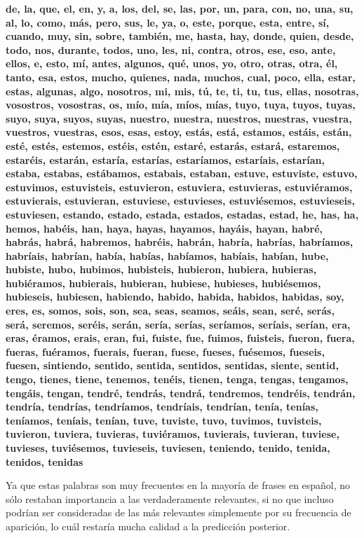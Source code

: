 \begin{displayquote}
\textbf{  de, la, que, el, en, y, a, los, del, se, las, por, un, para, con, no, una, su, al, lo, como, más, pero, sus, le, ya, o, este, porque, esta, entre, sí, cuando, muy, sin, sobre,
 también, me, hasta, hay, donde, quien, desde, todo, nos, durante, todos, uno, les, ni, contra, otros, ese, eso, ante, ellos, e, esto, mí, antes, algunos, qué, unos, yo, otro, otras, otra, él, tanto, esa, estos, mucho, quienes, nada, muchos, cual, poco, ella, estar, estas, algunas, algo, nosotros, mi, mis, tú, te, ti, tu, tus, ellas, nosotras, vosostros, vosostras, os, mío, mía, míos, mías, tuyo, tuya, tuyos, tuyas, suyo, suya, suyos, suyas, nuestro, nuestra, nuestros, nuestras, vuestra, vuestros, vuestras, esos, esas, estoy, estás, está, estamos, estáis, están, esté, estés, estemos, estéis, estén, estaré, estarás, estará, estaremos, estaréis, estarán, estaría, estarías, estaríamos, estaríais, estarían, estaba, estabas, 
 estábamos, estabais, estaban, estuve, estuviste, estuvo, estuvimos, estuvisteis, estuvieron, estuviera, estuvieras, estuviéramos, estuvierais, estuvieran, estuviese, estuvieses, 
 estuviésemos, estuvieseis, estuviesen, estando, estado, estada, estados, estadas, estad, he, has, ha, hemos, habéis, han, haya, hayas, hayamos, hayáis, hayan, habré, habrás, habrá, habremos, habréis, habrán, habría, habrías, habríamos, habríais, habrían, había, habías, habíamos, habíais, habían, 
 hube, hubiste, hubo, hubimos, hubisteis, hubieron, hubiera, hubieras, hubiéramos, hubierais, hubieran, hubiese,
 hubieses, hubiésemos, hubieseis, hubiesen, habiendo, habido, habida, habidos, habidas, soy, eres, es, somos, sois, son, sea, 
 seas, seamos, seáis, sean, seré, serás, será, seremos, 
 seréis, serán, sería, serías, seríamos, seríais, serían, era, 
 eras, éramos, erais, eran, fui, fuiste, fue, fuimos, 
 fuisteis, fueron, fuera, fueras, fuéramos, fuerais, fueran, fuese, fueses, fuésemos, fueseis, fuesen, sintiendo, sentido, sentida, sentidos, sentidas, siente, sentid, tengo, 
 tienes, tiene, tenemos, tenéis, tienen, tenga, tengas, tengamos, tengáis, tengan, tendré, tendrás, tendrá, tendremos, tendréis, tendrán, tendría, tendrías, tendríamos, tendríais, 
 tendrían, tenía, tenías, teníamos, teníais, tenían, tuve, tuviste, tuvo, tuvimos, tuvisteis, tuvieron, tuviera, tuvieras, tuviéramos, tuvierais, tuvieran, tuviese, tuvieses, tuviésemos, 
 tuvieseis, tuviesen, teniendo, tenido, tenida, tenidos, tenidas
}
\end{displayquote}


Ya que estas palabras son muy frecuentes en la mayoría de frases en español, no sólo restaban importancia a las verdaderamente relevantes, si no que incluso podrían ser consideradas de las más relevantes simplemente por su frecuencia de aparición, lo cuál restaría mucha calidad a la predicción posterior. 

